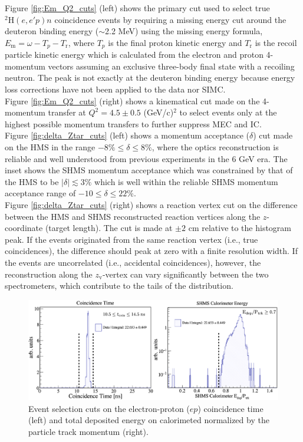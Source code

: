 \documentclass[aps, prl]{revtex4-2}  %
\begin{document}
\indent Figure \ref{fig:Em_Q2_cuts} (left) shows the primary cut used to select true $^{2}\mathrm{H}(e,e'p)n$ coincidence events by requiring a missing
energy cut around the deuteron binding energy ($\sim$2.2 MeV) using the missing energy formula, $E_{\mathrm{m}} = \omega - T_{p} - T_{\mathrm{r}}$, where
$T_{p}$ is the final proton kinetic energy and $T_{\mathrm{r}}$ is the recoil particle kinetic energy which is calculated from the electron and proton
4-momentum vectors assuming an exclusive three-body final state with a recoiling neutron. The peak is not exactly at the deuteron binding energy because
energy loss corrections have not been applied to the data nor SIMC. \\
\indent Figure \ref{fig:Em_Q2_cuts} (right) shows a
kinematical cut made on the 4-momentum transfer at $Q^{2} = 4.5\pm0.5$ (GeV/c)$^{2}$
to select events only at the highest possible momentum transfers to further suppress MEC and IC. \\
\indent Figure \ref{fig:delta_Ztar_cuts} (left) shows a momentum acceptance ($\delta$) cut made on the HMS in the range $-8\%\leq\delta\leq8\%$, where the optics reconstruction
is reliable and well understood from previous experiments in the 6 GeV era. The inset shows the SHMS momentum acceptance which was constrained by that of the HMS to be
$|\delta|\lesssim$3$\%$ which is well within the reliable SHMS momentum acceptance range of $-10 \leq \delta \leq22 \%$. \\
\indent Figure \ref{fig:delta_Ztar_cuts} (right) shows a reaction vertex cut
on the difference between the HMS and SHMS reconstructed reaction vertices along the $z$-coordinate (target length). The cut is made at $\pm2$ cm relative to the histogram peak.
If the events originated from the same reaction vertex (i.e., true coincidences), the difference should peak at zero with a finite resolution width. If the events are uncorrelated
(i.e., accidental coincidences), however, the reconstruction along the $z_{\mathrm{v}}$-vertex can vary significantly between the two spectrometers, which contribute to the tails of the
distribution.\\
\begin{figure}[!h]
\includegraphics[scale=0.23]{coin_and_eCal_CUT_80MeV_35deg.png}
\caption{Event selection cuts on the electron-proton ($ep$) coincidence time (left) and total deposited energy on calorimeted normalized by the particle track momentum (right).}
\label{fig:coin_ecal_cuts}
\end{figure}\\
\end{document}
